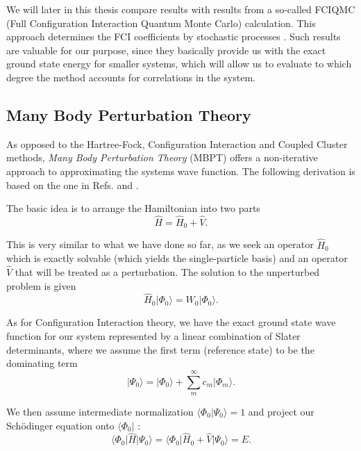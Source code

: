 We will later in this thesis compare results with results from a
so-called FCIQMC (Full Configuration Interaction Quantum Monte Carlo)
calculation. This approach determines the FCI coefficients by
stochastic processes \cite{Booth2013,Leikanger2013}. Such
results are valuable for our purpose, since they basically provide us
with the exact ground state energy for smaller systems, which will
allow us to evaluate to which degree the method accounts for
correlations in the system.

\subsection{Many Body Perturbation Theory}

As opposed to the Hartree-Fock, Configuration Interaction and
Coupled Cluster methods, \emph{Many Body Perturbation Theory} (MBPT)
offers a non-iterative approach to approximating the systems wave
function. The following derivation is based on the one in Refs.
\cite{ShavittBartlett2009} and \cite{hh4480}.

The basic idea is to arrange the Hamiltonian into two parts
\begin{equation}
\hat{H} = \hat{H}_0 + \hat{V}.
\end{equation}

This is very similar to what we have done so far, as we seek an
operator $\hat{H}_0$ which is exactly solvable (which yields the
single-particle basis) and an operator $\hat{V}$ that will be treated as a
perturbation. The solution to the unperturbed problem is given
\begin{equation}
\hat{H}_0 \vert \Phi_0 \rangle = W_0 \vert \Phi_0 \rangle.
\end{equation}

As for Configuration Interaction theory, we have the exact ground state wave
function for our system represented by a linear combination of Slater
determinants, where we assume the first term (reference state) to be
the dominating term
\begin{equation}
\vert \Psi_0 \rangle = \vert \Phi_0 \rangle + \sum_m^\infty c_m \vert \Phi_m \rangle.
\end{equation}
 
We then assume intermediate normalization $\langle \Phi_0 \vert
\Psi_0 \rangle = 1$ and project our Schödinger equation onto $\langle
\Phi_0 \vert$ :
\begin{equation}
\langle \Phi_0 \vert \hat{H} \vert \Psi_0 \rangle = \langle \Phi_0 \vert \hat{H}_0 + \hat{V} \vert \Psi_0 \rangle = E.
\end{equation}

